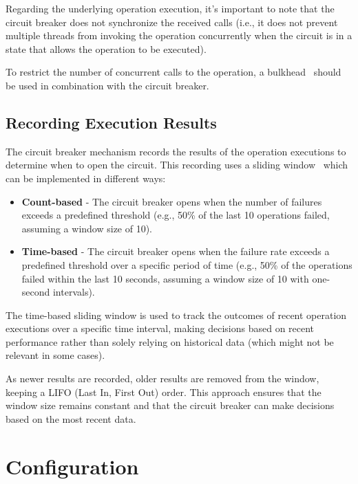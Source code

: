 Regarding the underlying operation execution,
it's important to note that the circuit breaker does not synchronize the received calls (i.e., it does not prevent multiple threads from invoking the operation concurrently when the circuit is in a state that allows the operation to be executed).

To restrict the number of concurrent calls to the operation, a bulkhead~\cite{microsoft-bulkhead-pattern} should be used in combination with the circuit breaker.

\subsection{Recording Execution Results}\label{subsec:cbreaker-recording-execution-results}

The circuit breaker mechanism records the results of the operation executions to determine when to open the circuit.
This recording uses a sliding window~\cite{sliding-window} which can be implemented in different ways:

\begin{itemize}
    \item \textbf{Count-based} -
    The circuit breaker opens when the number of failures exceeds a predefined threshold
    (e.g., 50\% of the last 10 operations failed, assuming a window size of 10).
    \item \textbf{Time-based} -
    The circuit breaker opens when the failure rate exceeds a predefined threshold over a specific period of time
    (e.g., 50\% of the operations failed within the last 10 seconds,
    assuming a window size of 10 with one-second intervals).
\end{itemize}

The time-based sliding window is used
to track the outcomes of recent operation executions over a specific time interval,
making decisions based on recent performance rather than solely relying on historical data
(which might not be relevant in some cases).

As newer results are recorded, older results are removed from the window, keeping a
LIFO (Last In, First Out) order.
This approach ensures that the window size remains constant and that the circuit breaker can make decisions based on the most recent data.


\section{Configuration}\label{sec:cbreaker-configuration}

